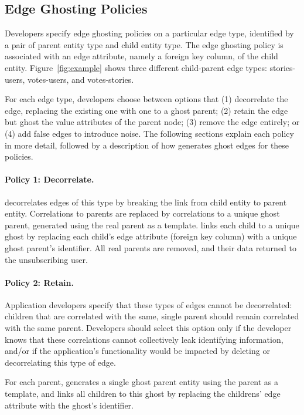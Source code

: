 \subsection{Edge Ghosting Policies}
Developers specify edge ghosting policies on a particular edge type, identified by a pair of parent
entity type and child entity type. The edge ghosting policy is associated with an edge attribute,
namely a foreign key column, of the child entity. Figure~\ref{fig:example} shows three different
child-parent edge types: stories-users, votes-users, and votes-stories.

For each edge type, developers choose between options that (1) decorrelate the edge, replacing
the existing one with one to a ghost parent; (2) retain the edge but ghost the value attributes of the
parent node; (3) remove the edge entirely; or (4) add false edges to introduce noise.
The following sections explain each policy in more detail, followed by a description of how \sys
generates ghost edges for these policies.

\paragraph{Policy 1: Decorrelate.}
\sys decorrelates edges of this type by breaking the link from child entity to parent entity.
Correlations to parents are replaced by correlations to a unique ghost parent, generated using the
real parent as a template.  \sys links each child to a unique ghost by replacing each child's edge
attribute (foreign key column) with a unique ghost parent's identifier. 
All real parents are removed, and their data returned to the unsubscribing user.

\paragraph{Policy 2: Retain.}
Application developers specify that these types of edges cannot be decorrelated: children 
that are correlated with the same, single parent should remain correlated with the same 
parent. Developers should select this option only if the developer knows that these correlations
cannot collectively leak identifying information, and/or if the application's functionality would be
impacted by deleting or decorrelating this type of edge.

For each parent, \sys generates a single ghost parent entity using the parent as a template, and
links all children to this ghost by replacing the childrens' edge attribute with the ghost's
identifier.

